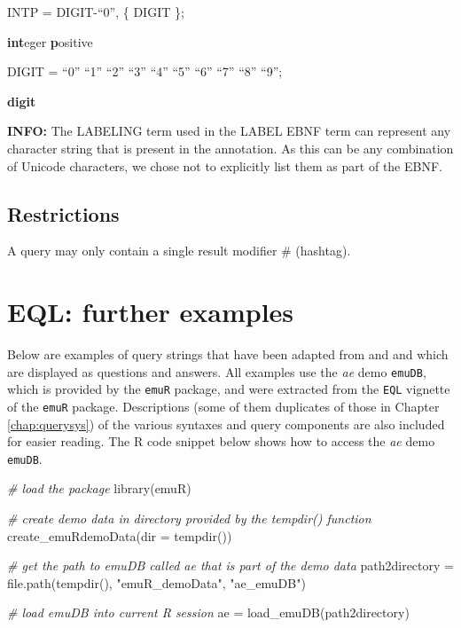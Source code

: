 \documentclass[
]{book}
\newenvironment{Shaded}{\begin{snugshade}}{\end{snugshade}}
\newcommand{\AttributeTok}[1]{\textcolor[rgb]{0.77,0.63,0.00}{#1}}
\newcommand{\CommentTok}[1]{\textcolor[rgb]{0.56,0.35,0.01}{\textit{#1}}}
\newcommand{\FunctionTok}[1]{\textcolor[rgb]{0.00,0.00,0.00}{#1}}
\newcommand{\NormalTok}[1]{#1}
\newcommand{\OtherTok}[1]{\textcolor[rgb]{0.56,0.35,0.01}{#1}}
\newcommand{\StringTok}[1]{\textcolor[rgb]{0.31,0.60,0.02}{#1}}
\begin{document}
INTP = DIGIT-``0'', \{ DIGIT \};

\textbf{int}eger \textbf{p}ositive

DIGIT = ``0'' \textbar{} ``1'' \textbar{} ``2'' \textbar{} ``3'' \textbar{} ``4'' \textbar{} ``5'' \textbar{} ``6'' \textbar{} ``7'' \textbar{} ``8'' \textbar{} ``9'';

\textbf{digit}

\textbf{INFO:} The LABELING term used in the LABEL EBNF term can represent any character string that is present in the annotation. As this can be any combination of Unicode characters, we chose not to explicitly list them as part of the EBNF.

\hypertarget{restrictions}{%
\section{Restrictions}\label{restrictions}}

A query may only contain a single result modifier \# (hashtag).

\hypertarget{app-chap:eql}{%
\chapter{EQL: further examples}\label{app-chap:eql}}

Below are examples of query strings that have been adapted from \citet{cassidy:sc2001a} and \citet{harrington:2002aa} and which are displayed as questions and answers. All examples use the \emph{ae} demo \texttt{emuDB}, which is provided by the \texttt{emuR} package, and were extracted from the \texttt{EQL} vignette of the \texttt{emuR} package. Descriptions (some of them duplicates of those in Chapter \ref{chap:querysys}) of the various syntaxes and query components are also included for easier reading. The R code snippet below shows how to access the \emph{ae} demo \texttt{emuDB}.

\begin{Shaded}
\begin{Highlighting}[]
\CommentTok{\# load the package }
\FunctionTok{library}\NormalTok{(emuR)}

\CommentTok{\# create demo data in directory provided by the tempdir() function}
\FunctionTok{create\_emuRdemoData}\NormalTok{(}\AttributeTok{dir =} \FunctionTok{tempdir}\NormalTok{())}

\CommentTok{\# get the path to emuDB called \textquotesingle{}ae\textquotesingle{} that is part of the demo data}
\NormalTok{path2directory }\OtherTok{=} \FunctionTok{file.path}\NormalTok{(}\FunctionTok{tempdir}\NormalTok{(), }\StringTok{"emuR\_demoData"}\NormalTok{, }\StringTok{"ae\_emuDB"}\NormalTok{)}

\CommentTok{\# load emuDB into current R session}
\NormalTok{ae }\OtherTok{=} \FunctionTok{load\_emuDB}\NormalTok{(path2directory)}
\end{Highlighting}
\end{Shaded}
\end{document}

